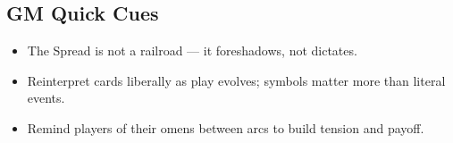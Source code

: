 \subsection{GM Quick Cues}

\begin{itemize}
  \item The Spread is not a railroad --- it foreshadows, not dictates.
  \item Reinterpret cards liberally as play evolves; symbols matter more than literal events.
  \item Remind players of their omens between arcs to build tension and payoff.
\end{itemize}

